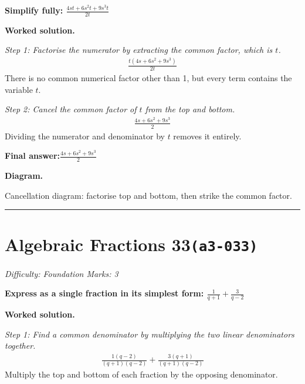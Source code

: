 \documentclass[11pt]{article}
\newcommand{\question}[1]{\par\medskip\noindent\textbf{#1}\par}
\begin{document}
\question{Simplify fully: \( \frac{4st + 6s^2t + 9s^3t}{2t} \)}

\textbf{Worked solution.}

\textit{Step 1: Factorise the numerator by extracting the common factor, which is \( t \).}
\[\begin{gathered}
\frac{t(4s + 6s^2 + 9s^3)}{2t}
\end{gathered}\]
There is no common numerical factor other than 1, but every term contains the variable \( t \).

\textit{Step 2: Cancel the common factor of \( t \) from the top and bottom.}
\[\begin{gathered}
\frac{4s + 6s^2 + 9s^3}{2}
\end{gathered}\]
Dividing the numerator and denominator by \( t \) removes it entirely.

\begin{answerbox}
\textbf{Final answer:}\quad \(\displaystyle \frac{4s + 6s^2 + 9s^3}{2}\)
\end{answerbox}
\textbf{Diagram.}

\begin{center}
\end{center}
\small Cancellation diagram: factorise top and bottom, then strike the common factor.\normalsize

\medskip\hrule

\section*{Algebraic Fractions 33\quad\small\texttt{(a3-033)}}
\textit{Difficulty: Foundation \quad\textbar\quad Marks: 3}

\question{Express as a single fraction in its simplest form: \( \frac{1}{q+1} + \frac{3}{q-2} \)}

\textbf{Worked solution.}

\textit{Step 1: Find a common denominator by multiplying the two linear denominators together.}
\[\begin{gathered}
\frac{1(q-2)}{(q+1)(q-2)} + \frac{3(q+1)}{(q+1)(q-2)}
\end{gathered}\]
Multiply the top and bottom of each fraction by the opposing denominator.
\end{document}
